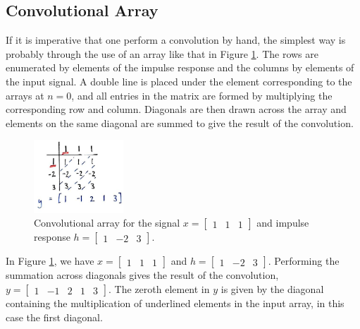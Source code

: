 \subsection{Convolutional Array}
%
If it is imperative that one perform a convolution by hand, the simplest
way is probably through the use of an array like that in Figure
\ref{fig::lecture_3_convolution_grid_one}. The rows are enumerated by elements
of the impulse response and the columns by elements of the input signal.
A double line is placed under the element corresponding to the arrays
at $n=0$, and all entries in the matrix are formed by multiplying the
corresponding row and column. Diagonals are then drawn across the array
and elements on the same diagonal are summed to give the result of the
convolution.
%
\begin{figure}[H]
  \includegraphics[width=0.3\textwidth]{images/lecture_3_convolution_grid_one.JPG}
  \caption{
    Convolutional array for the signal
    $x = \left[\begin{array}{ccc} 1 & 1 & 1\end{array}\right]$ and
    impulse response
    $h = \left[\begin{array}{ccc} 1 & -2 & 3\end{array}\right]$.
  }
  \label{fig::lecture_3_convolution_grid_one}
\end{figure}
%
In Figure \ref{fig::lecture_3_convolution_grid_one}, we have
$x = \left[\begin{array}{ccc} 1 & 1 & 1\end{array}\right]$ and
$h = \left[\begin{array}{ccc} 1 & -2 & 3\end{array}\right]$. Performing the
summation across diagonals gives the result of the convolution,
$y = \left[\begin{array}{ccccc} 1 & -1 & 2 & 1 & 3\end{array}\right]$. The
zeroth element in $y$ is given by the diagonal containing the multiplication
of underlined elements in the input array, in this case the first diagonal.

